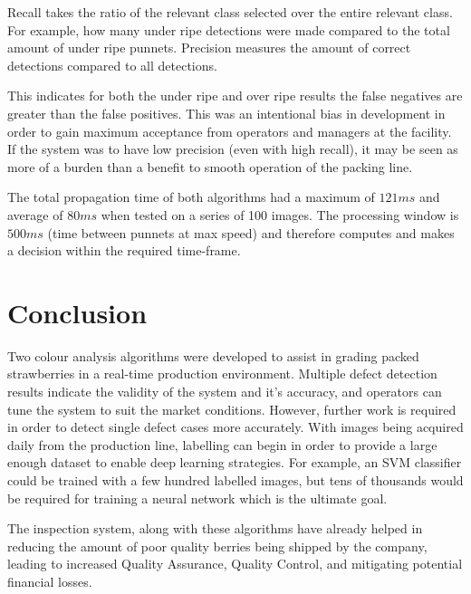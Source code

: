 \documentclass[fleqn,twoside,12pt]{report}
\begin{document}
Recall takes the ratio of the relevant class selected over the entire relevant class. For example, how many under ripe detections were made compared to the total amount of under ripe punnets. Precision measures the amount of correct detections compared to all detections. 

This indicates for both the under ripe and over ripe results the false negatives are greater than the false positives. This was an intentional bias in development in order to gain maximum acceptance from operators and managers at the facility. If the system was to have low precision (even with high recall), it may be seen as more of a burden than a benefit to smooth operation of the packing line.

The total propagation time of both algorithms had a maximum of $121ms$ and average of $80ms$ when tested on a series of 100 images. The processing window is $500ms$ (time between punnets at max speed) and therefore computes and makes a decision within the required time-frame.




\section{Conclusion}

Two colour analysis algorithms were developed to assist in grading packed strawberries in a real-time production environment. Multiple defect detection results indicate the validity of the system and it's accuracy, and operators can tune the system to suit the market conditions. However, further work is required in order to detect single defect cases more accurately. With images being acquired daily from the production line, labelling can begin in order to provide a large enough dataset to enable deep learning strategies. For example, an SVM classifier could be trained with a few hundred labelled images, but tens of thousands would be required for training a neural network which is the ultimate goal. 


The inspection system, along with these algorithms have already helped in reducing the amount of poor quality berries being shipped by the company, leading to increased Quality Assurance, Quality Control, and mitigating potential financial losses.


\end{document}
